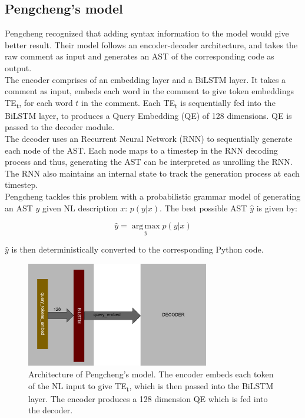 \documentclass{IEEEtran}
\begin{document}
      \subsection{Pengcheng's model}
      Pengcheng recognized that adding syntax information to the model would give better
      result. Their model follows an encoder-decoder architecture, and takes
      the raw comment as input and generates an AST of the corresponding 
      code as output. \\
      \hspace*{4mm}The encoder comprises of an embedding layer and a BiLSTM
      layer. It takes a comment as input, embeds each word in the comment to give token embeddings
      TE\textsubscript{t}, for each word $ t $ in the comment. Each TE\textsubscript{t} is 
      sequentially fed into the 
      BiLSTM layer, to produces a Query Embedding (QE) of 128 dimensions. QE is passed to the
      decoder module. \\
      \hspace*{4mm}The decoder uses an Recurrent Neural Network (RNN) to sequentially generate 
      each node of the AST. Each node maps to a timestep in the RNN decoding process and thus, 
      generating the AST can be interpreted as unrolling the RNN. The RNN also maintains an 
      internal state to track the generation process at each timestep. \\
      \hspace*{4mm}Pengcheng tackles this problem with a probabilistic grammar model of
      generating an AST $ y $ given NL description $ x $: $ p(y\vert x) $. The best possible AST 
      $ \hat{y} $ is given by:

      \begin{equation}
        \label{eq:pengcheng}
        \hat{y} = \operatorname*{arg\,max}_y p(y\vert x)
      \end{equation}

      $ \hat{y} $ is then deterministically converted to the corresponding Python code.

      \begin{figure}[h]
        \centering
        \includegraphics[width=8cm]{pengcheng.png}
        \caption{Architecture of Pengcheng's model. The encoder embeds each token of the NL input
        to give TE\textsubscript{t}, which is then passed into the BiLSTM layer. The encoder
        produces a 128 dimension QE which is fed into the decoder.}
        \label{fig:pengcheng}
      \end{figure}
\end{document}
